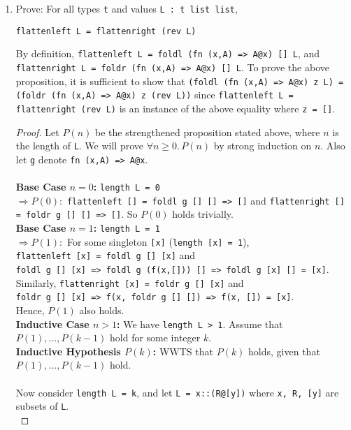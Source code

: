 \documentclass[11pt]{article}
\begin{document}
\begin{enumerate}
\item Prove: For all types \verb|t| and values \verb|L : t list list|,
\begin{center}\verb|flattenleft L = flattenright (rev L)|\end{center}
\begin{flushleft}
By definition, \verb|flattenleft L = foldl (fn (x,A) => A@x) [] L|, and \verb|flattenright L = foldr (fn (x,A) => A@x) [] L|.  To prove the above proposition, it is sufficient to show that \verb|(foldl (fn (x,A) => A@x) z L) = (foldr (fn (x,A) => A@x) z (rev L))| since \verb|flattenleft L = flattenright (rev L)| is an instance of the above equality where \verb|z = []|.
\end{flushleft}
\begin{proof}
Let $P(n)$ be the strengthened proposition stated above, where $n$ is the length of \verb|L|.  We will prove $\forall n \geq 0.\, P(n)$ by strong induction on $n$.  Also let \verb|g| denote \verb|fn (x,A) => A@x|.\\\\
\textbf{Base Case $n = 0$:} \verb|length L = 0|\\
 $\Rightarrow P(0):$ \verb|flattenleft [] = foldl g [] [] => []| and \verb|flattenright [] = foldr g [] [] => []|. So $P(0)$ holds trivially.\\
\textbf{Base Case $n = 1$:} \verb|length L = 1|\\
$\Rightarrow P(1):$ For some singleton \verb|[x]| (\verb|length [x] = 1|),\\
\verb|flattenleft [x] = foldl g [] [x]| and\\
\verb|foldl g [] [x] => foldl g (f(x,[])) [] => foldl g [x] [] = [x]|.\\
Similarly, \verb|flattenright [x] = foldr g [] [x]| and\\
\verb|foldr g [] [x] => f(x, foldr g [] []) => f(x, []) = [x]|.\\
Hence, $P(1)$ also holds.\\
\textbf{Inductive Case $n > 1$:} We have \verb|length L > 1|.  Assume that $P(1),...,P(k-1)$ hold for some integer $k$.\\
\textbf{Inductive Hypothesis $P(k)$:} WWTS that $P(k)$ holds, given that $P(1),...,P(k-1)$ hold.\\\\
Now consider \verb|length L = k|, and let \verb|L = x::(R@[y])| where \verb|x, R, [y]| are subsets of \verb|L|.\\

\end{proof}
\end{enumerate}
\end{document}
